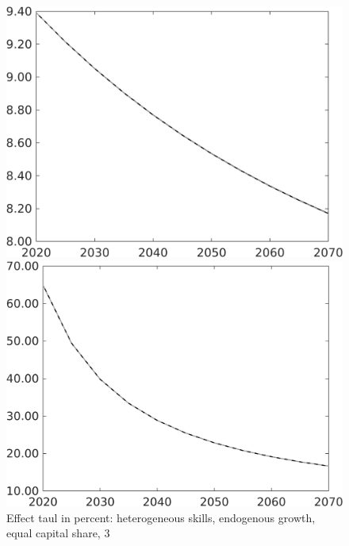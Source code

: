 \documentclass[12pt]{article}
\begin{document}
\begin{figure}[h!!]
	\centering
	\caption{Effect taul in percent: heterogeneous skills, endogenous growth, equal capital share, 3}\label{fig:LF_BAU_nsk0_xgr0_equalcapShare3}
	
	\begin{minipage}[]{0.32\textwidth}
		\includegraphics[width=1\textwidth]{../../codding_model/own_basedOnFried/optimalPol_010922_revision/figures/all_13Sept22/CompTaul_Equlab_LFBAU_Reg0_gAn_spillover0_nsk0_xgr0_knspil0_sep1_countec0_GovRev0_etaa0.79_lgd0.png}
	\end{minipage}	
	\begin{minipage}[]{0.32\textwidth}
		\includegraphics[width=1\textwidth]{../../codding_model/own_basedOnFried/optimalPol_010922_revision/figures/all_13Sept22/CompTaul_Equlab_LFBAU_Reg0_gAg_spillover0_nsk0_xgr0_knspil0_sep1_countec0_GovRev0_etaa0.79_lgd0.png}

\end{minipage}
\end{figure}
\end{document}
